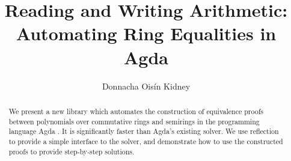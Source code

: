 \documentclass[acmsmall]{acmart}\settopmatter{printfolios=true,printccs=false,printacmref=false}
\theoremstyle{remark}
\begin{document}
\title[Reading and Writing Arithmetic]{Reading and Writing Arithmetic: Automating Ring Equalities
  in Agda}


\author{Donnacha Oisín Kidney}
\begin{abstract}
  We present a new library which automates the construction of equivalence
  proofs between polynomials over commutative rings and semirings in the
  programming language Agda \cite{norell_dependently_2008}. It is significantly
  faster than Agda's existing solver. We use reflection to provide a simple
  interface to the solver, and demonstrate how to use the constructed proofs to
  provide step-by-step solutions.
\end{abstract}


\end{document}
